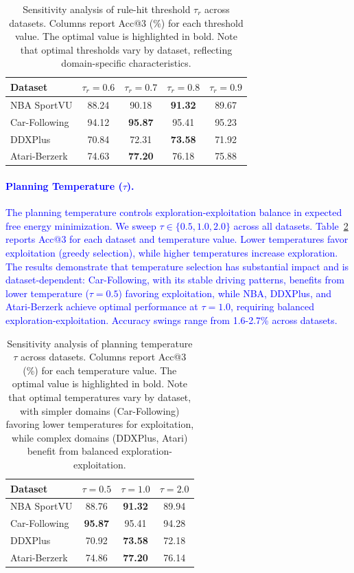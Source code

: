 \documentclass{article} %
\newcommand{\revise}[1]{\textcolor{blue}{#1}}
\begin{document}
\begin{table}[!t]
\centering
\small
\caption{Sensitivity analysis of rule-hit threshold $\tau_r$ across datasets. Columns report Acc@3 (\%) for each threshold value. The optimal value is highlighted in bold. Note that optimal thresholds vary by dataset, reflecting domain-specific characteristics.}
\label{tab:tau_r_sensitivity}
\begin{tabular}{lcccc}
\toprule
\textbf{Dataset} & $\tau_r=0.6$ & $\tau_r=0.7$ & $\tau_r=0.8$ & $\tau_r=0.9$ \\
\midrule
NBA SportVU & 88.24 & 90.18 & \textbf{91.32} & 89.67 \\
Car-Following & 94.12 & \textbf{95.87} & 95.41 & 95.23 \\
DDXPlus & 70.84 & 72.31 & \textbf{73.58} & 71.92 \\
Atari-Berzerk & 74.63 & \textbf{77.20} & 76.18 & 75.88 \\
\bottomrule
\end{tabular}
\end{table}
\revise{\paragraph{Planning Temperature ($\tau$).}
The planning temperature controls exploration-exploitation balance in expected free energy minimization. We sweep $\tau \in \{0.5, 1.0, 2.0\}$ across all datasets. Table~\ref{tab:tau_sensitivity} reports Acc@3 for each dataset and temperature value. Lower temperatures favor exploitation (greedy selection), while higher temperatures increase exploration. The results demonstrate that temperature selection has substantial impact and is dataset-dependent: Car-Following, with its stable driving patterns, benefits from lower temperature ($\tau=0.5$) favoring exploitation, while NBA, DDXPlus, and Atari-Berzerk achieve optimal performance at $\tau=1.0$, requiring balanced exploration-exploitation. Accuracy swings range from 1.6-2.7\% across datasets.}
\begin{table}[!t]
\centering
\small
\caption{Sensitivity analysis of planning temperature $\tau$ across datasets. Columns report Acc@3 (\%) for each temperature value. The optimal value is highlighted in bold. Note that optimal temperatures vary by dataset, with simpler domains (Car-Following) favoring lower temperatures for exploitation, while complex domains (DDXPlus, Atari) benefit from balanced exploration-exploitation.}
\label{tab:tau_sensitivity}
\begin{tabular}{lccc}
\toprule
\textbf{Dataset} & $\tau=0.5$ & $\tau=1.0$ & $\tau=2.0$ \\
\midrule
NBA SportVU & 88.76 & \textbf{91.32} & 89.94 \\
Car-Following & \textbf{95.87} & 95.41 & 94.28 \\
DDXPlus & 70.92 & \textbf{73.58} & 72.18 \\
Atari-Berzerk & 74.86 & \textbf{77.20} & 76.14 \\
\bottomrule
\end{tabular}
\end{table}
\end{document}
